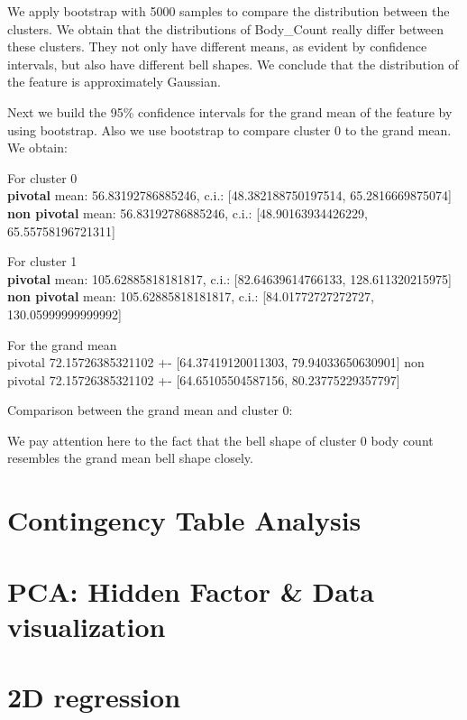 \documentclass[a4paper,14pt]{article}
\begin{document}
We apply bootstrap with 5000 samples to compare the distribution between the clusters. We obtain that  the distributions of Body\_Count really differ between these clusters. They not only have different means, as evident by confidence intervals, but also have different bell shapes. We conclude that the distribution of the feature is approximately Gaussian.

Next we build the 95\% confidence intervals for the grand mean of the feature by using bootstrap. Also we use bootstrap to compare cluster 0 to the grand mean.  We obtain:

\footnotesize
For cluster 0 \\
\textbf{pivotal} mean: 56.83192786885246, c.i.: [48.382188750197514, 65.2816669875074] \\
\textbf{non pivotal} mean: 56.83192786885246, c.i.: [48.90163934426229, 65.55758196721311]

For cluster 1 \\
\textbf{pivotal} mean:  105.62885818181817, c.i.:  [82.64639614766133, 128.611320215975] \\
\textbf{non pivotal} mean:  105.62885818181817, c.i.:  [84.01772727272727, 130.05999999999992]

For the grand mean \\
pivotal 72.15726385321102 +- [64.37419120011303, 79.94033650630901]
non pivotal 72.15726385321102 +- [64.65105504587156, 80.23775229357797]

\normalsize

Comparison between the grand mean and cluster 0:
    \begin{center}
\end{center}
We pay attention here to the fact that the bell shape of cluster 0 body count resembles the grand mean bell shape closely.
    \begin{center}
\end{center}


    \section{Contingency Table Analysis}
    \section{PCA: Hidden Factor \& Data visualization}
    \section{2D regression}
    
\end{document}
